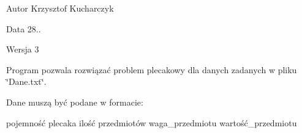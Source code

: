 \begin{DoxyAuthor}{\-Autor}
\-Krzysztof \-Kucharczyk 
\end{DoxyAuthor}
\begin{DoxyDate}{\-Data}
28.. 
\end{DoxyDate}
\begin{DoxyVersion}{\-Wersja}
3
\end{DoxyVersion}
\-Program pozwala rozwiązać problem plecakowy dla danych zadanych w pliku \char`\"{}\-Dane.\-txt\char`\"{}. \par
 \-Dane muszą być podane w formacie\-:

pojemność plecaka ilość przedmiotów waga\-\_\-przedmiotu wartość\-\_\-przedmiotu 